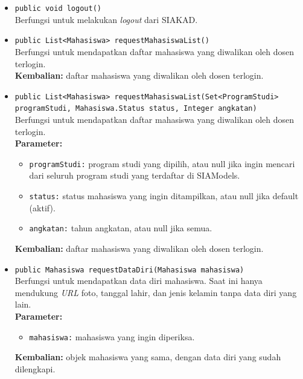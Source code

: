 \begin{enumerate}
\begin{itemize}
        \item \texttt{public void logout()}\\
	    Berfungsi untuk melakukan \textit{logout} dari SIAKAD.
	    
	    \item \texttt{public List<Mahasiswa> requestMahasiswaList()}\\
	    Berfungsi untuk mendapatkan daftar mahasiswa yang diwalikan oleh dosen terlogin.\\
        \textbf{Kembalian:} daftar mahasiswa yang diwalikan oleh dosen terlogin.
        
        \item \texttt{public List<Mahasiswa> requestMahasiswaList(Set<ProgramStudi> programStudi, Mahasiswa.Status status, Integer angkatan)}\\
         Berfungsi untuk mendapatkan daftar mahasiswa yang diwalikan oleh dosen terlogin.\\
        \textbf{Parameter:}
		\begin{itemize}
			\item \texttt{programStudi:} program studi yang dipilih, atau null jika ingin mencari dari seluruh program studi yang terdaftar di SIAModels.
			\item \texttt{status:} status mahasiswa yang ingin ditampilkan, atau null jika default (aktif).
			\item \texttt{angkatan:} tahun angkatan, atau null jika semua.
		\end{itemize}
        \textbf{Kembalian:} daftar mahasiswa yang diwalikan oleh dosen terlogin.

	    \item \texttt{public Mahasiswa requestDataDiri(Mahasiswa mahasiswa)}\\
	    Berfungsi untuk mendapatkan data diri mahasiswa. Saat ini hanya mendukung \textit{URL} foto, tanggal lahir, dan jenis kelamin tanpa data diri yang lain.\\
	    \textbf{Parameter:}
		\begin{itemize}
			\item \texttt{mahasiswa:} mahasiswa yang ingin diperiksa.
		\end{itemize}
        \textbf{Kembalian:} objek mahasiswa yang sama, dengan data diri yang sudah dilengkapi.
        

\end{itemize}
\end{enumerate}

